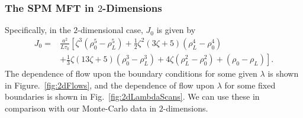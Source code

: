 \subsubsection{The SPM MFT in $2$-Dimensions}
Specifically, in the $2$-dimensional case, $J_0$ is given by
\begin{equation}
\begin{aligned}
 J_0 = &\frac{a^2}{L \tau_0} \left[ \zeta^3\left(\rho_0^5 - \rho_L^5\right) +\frac{1}{2} \zeta^2 \left(3 \zeta+5\right)
 \left(\rho_L^4  - \rho_0^4 \right) \right. \\  
  &+ \left.\frac{1}{3}\zeta\left(13 \zeta+5\right)\left( \rho_0^3 -\rho_L^3 \right)+ 4 \zeta \left( \rho_L^2
 -\rho_0^2 \right)+\left(\rho_0 - \rho_L\right) \right].
\end{aligned}
\end{equation}
The dependence of flow upon the boundary conditions for some given $\lambda$ is shown in
Figure.~\ref{fig:2dFlows}, and the dependence of flow upon $\lambda$ for some fixed boundaries is shown in Fig.~\ref{fig:2dLambdaScans}. We can use these in comparison with our Monte-Carlo data in
$2$-dimensions.
